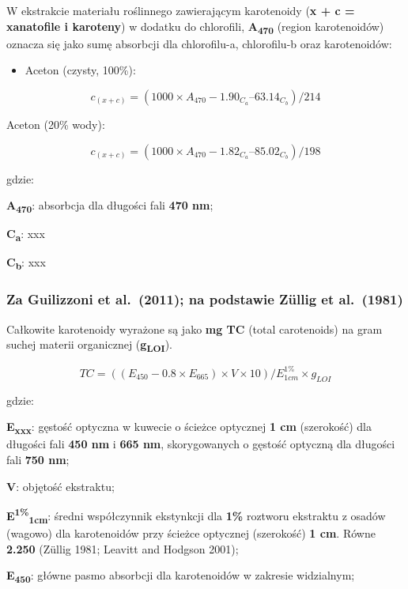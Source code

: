 \documentclass[
  letterpaper,
  DIV=11,
  numbers=noendperiod]{scrreprt}
\providecommand{\tightlist}{%
  \setlength{\itemsep}{0pt}\setlength{\parskip}{0pt}}\usepackage{longtable,booktabs,array}
\begin{document}
W ekstrakcie materiału roślinnego zawierającym karotenoidy (\textbf{x +
c = xanatofile i karoteny}) w dodatku do chlorofili,
\textbf{A\textsubscript{470}} (region karotenoidów) oznacza się jako
sumę absorbcji dla chlorofilu-a, chlorofilu-b oraz karotenoidów:

\begin{itemize}
\tightlist
\item
  Aceton (czysty, 100\%):
\end{itemize}

\[
c_{(x + c)} = (1000 × A_{470} - 1.90_{C_a} – 63.14_{C_b}) / 214
\]

Aceton (20\% wody):

\[
c_{(x + c)} = (1000 × A_{470} - 1.82_{C_a} – 85.02_{C_b}) / 198
\]

gdzie:

\textbf{A\textsubscript{470}}: absorbcja dla długości fali \textbf{470
nm};

\textbf{C\textsubscript{a}}: xxx

\textbf{C\textsubscript{b}}: xxx

\hypertarget{za-guilizzoni-et-al.-2011-na-podstawie-zuxfcllig-et-al.-1981}{%
\subsubsection{Za Guilizzoni et al.~(2011); na podstawie Züllig et
al.~(1981)}\label{za-guilizzoni-et-al.-2011-na-podstawie-zuxfcllig-et-al.-1981}}

Całkowite karotenoidy wyrażone są jako \textbf{mg TC} (total
carotenoids) na gram suchej materii organicznej
(\textbf{g\textsubscript{LOI}}).

\[
TC = ((E_{450} - 0.8 × E_{665}) × V × 10) / E^{1\%}_{1cm} × g_{LOI}
\]

gdzie:

\textbf{E\textsubscript{xxx}}: gęstość optyczna w kuwecie o ścieżce
optycznej \textbf{1 cm} (szerokość) dla długości fali \textbf{450 nm} i
\textbf{665 nm}, skorygowanych o gęstość optyczną dla długości fali
\textbf{750 nm};

\textbf{V}: objętość ekstraktu;

\textbf{E\textsuperscript{1\%}\textsubscript{1cm}}: średni współczynnik
ekstynkcji dla \textbf{1\%} roztworu ekstraktu z osadów (wagowo) dla
karotenoidów przy ścieżce optycznej (szerokość) \textbf{1 cm}. Równe
\textbf{2.250} (Züllig 1981; Leavitt and Hodgson 2001);

\textbf{E\textsubscript{450}}: główne pasmo absorbcji dla karotenoidów w
zakresie widzialnym;
\end{document}

